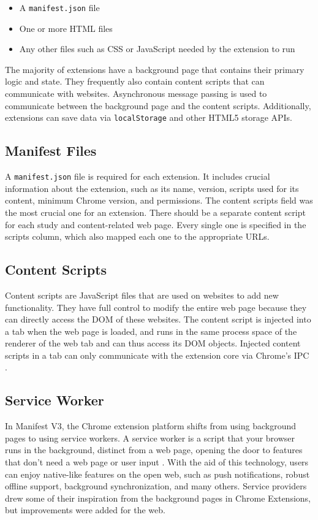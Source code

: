 \begin{itemize}
  \item A \texttt{manifest.json} file
  \item One or more HTML files
  \item Any other files such as CSS or JavaScript needed by the extension to run
\end{itemize}

The majority of extensions have a background page that contains their primary logic and state. They frequently also contain content scripts that can communicate with websites. Asynchronous message passing is used to communicate between the background page and the content scripts. Additionally, extensions can save data via \texttt{localStorage} and other HTML5 storage APIs.

\subsection{Manifest Files}
A \texttt{manifest.json} file is required for each extension. It includes crucial information about the extension, such as its name, version, scripts used for its content, minimum Chrome version, and permissions. The content scripts field was the most crucial one for an extension. There should be a separate content script for each study and content-related web page. Every single one is specified in the scripts column, which also mapped each one to the appropriate URLs.

\subsection{Content Scripts}
Content scripts are JavaScript files that are used on websites to add new functionality. They have full control to modify the entire web page because they can directly access the DOM of these websites. The content script is injected into a tab when the web page is loaded, and runs in the same process space of the renderer of the web tab and can thus access its DOM objects. Injected content scripts in a tab can only communicate with the extension core via Chrome's IPC \autocite{liu2012chrome}.

\subsection{Service Worker}
\label{service_worker}
In Manifest V3, the Chrome extension platform shifts from using background pages to using service workers. A service worker is a script that your browser runs in the background, distinct from a web page, opening the door to features that don't need a web page or user input \autocite{chrome2021service}. With the aid of this technology, users can enjoy native-like features on the open web, such as push notifications, robust offline support, background synchronization, and many others. Service providers drew some of their inspiration from the background pages in Chrome Extensions, but improvements were added for the web.

